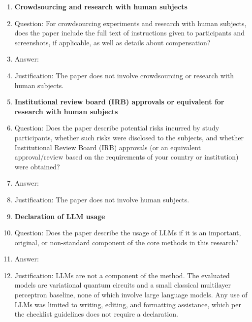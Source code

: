 \begin{enumerate}
\item {\bf Crowdsourcing and research with human subjects}
    \item[] Question: For crowdsourcing experiments and research with human subjects, does the paper include the full text of instructions given to participants and screenshots, if applicable, as well as details about compensation?
    \item[] Answer: \answerNA{}
    \item[] Justification: The paper does not involve crowdsourcing or research with human subjects.

\item {\bf Institutional review board (IRB) approvals or equivalent for research with human subjects}
    \item[] Question: Does the paper describe potential risks incurred by study participants, whether such risks were disclosed to the subjects, and whether Institutional Review Board (IRB) approvals (or an equivalent approval/review based on the requirements of your country or institution) were obtained?
    \item[] Answer: \answerNA{}
    \item[] Justification: The paper does not involve human subjects.

\item {\bf Declaration of LLM usage}
    \item[] Question: Does the paper describe the usage of LLMs if it is an important, original, or non-standard component of the core methods in this research?
    \item[] Answer: \answerNA{}
    \item[] Justification: LLMs are not a component of the method. The evaluated models are variational quantum circuits and a small classical multilayer perceptron baseline, none of which involve large language models. Any use of LLMs was limited to writing, editing, and formatting assistance, which per the checklist guidelines does not require a declaration.

\end{enumerate}

